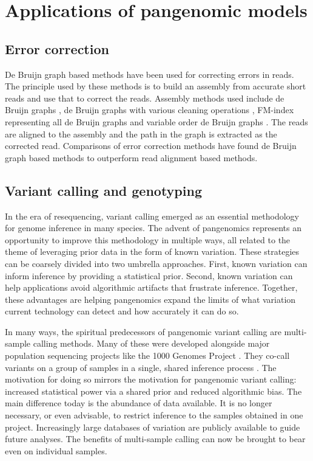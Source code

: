 \section{Applications of pangenomic models}

\subsection{Error correction}

De Bruijn graph based methods have been used for correcting errors in reads.
The principle used by these methods is to build an assembly from accurate short reads and use that to correct the reads.
Assembly methods used include de Bruijn graphs \cite{Salmela2014LoRDEC, Salmela2016LORMA}, de Bruijn graphs with various cleaning operations \cite{Miclotte2016Jabba, Limasset_2019, Rautiainen_2019b, Marchet_2019}, FM-index representing all de Bruijn graphs \cite{Wang2018FMLRC} and variable order de Bruijn graphs \cite{Morisse2018HGcolor, Morisse2019Consent}.
The reads are aligned to the assembly and the path in the graph is extracted as the corrected read.
Comparisons of error correction methods \cite{Fu2019ErrorCorrectionSurvey, Zhang2019ErrorCorrectionSurvey} have found de Bruijn graph based methods to outperform read alignment based methods.

\subsection{Variant calling and genotyping}


In the era of resequencing, variant calling emerged as an essential methodology for genome inference in many species.
The advent of pangenomics represents an opportunity to improve this methodology in multiple ways, all related to the theme of leveraging prior data in the form of known variation.
These strategies can be coarsely divided into two umbrella approaches.
First, known variation can inform inference by providing a statistical prior.
Second, known variation can help applications avoid algorithmic artifacts that frustrate inference.
Together, these advantages are helping pangenomics expand the limits of what variation current technology can detect and how accurately it can do so.

In many ways, the spiritual predecessors of pangenomic variant calling are multi-sample calling methods. 
Many of these were developed alongside major population sequencing projects like the 1000 Genomes Project \cite{1000_2015}.
They co-call variants on a group of samples in a single, shared inference process \cite{Li_2011,Garrison_2012}.
The motivation for doing so mirrors the motivation for pangenomic variant calling: increased statistical power via a shared prior and reduced algorithmic bias.
The main difference today is the abundance of data available.
It is no longer necessary, or even advisable, to restrict inference to the samples obtained in one project.
Increasingly large databases of variation are publicly available to guide future analyses.
The benefits of multi-sample calling can now be brought to bear even on individual samples.

